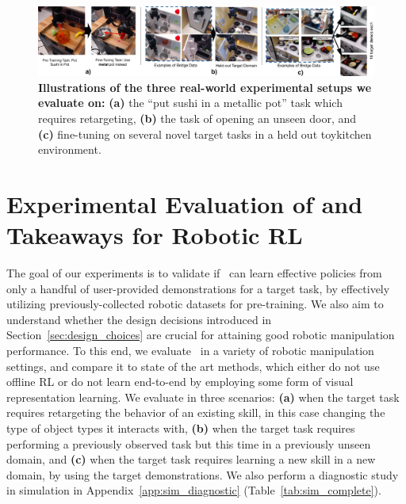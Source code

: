 \begin{figure}
\centering
  \includegraphics[width=1.0\linewidth]{chapters/ptr/scenarios_overview.pdf}
  \vspace{-0.3cm}
  \caption{\footnotesize{\textbf{Illustrations of the three real-world experimental setups we evaluate \ptrmethodname on:} \textbf{(a)} the ``put sushi in a metallic pot'' task which requires retargeting, \textbf{(b)} the task of opening an unseen door, and \textbf{(c)} fine-tuning on several novel target tasks in a held out toykitchen environment.}}
  \vspace{-0.6cm}
  \label{fig:experiments}
\end{figure}

\vspace{-0.2cm}
\section{Experimental Evaluation of \ptrmethodname and Takeaways for Robotic RL}
\label{sec:result}
\vspace{-0.2cm}
The goal of our experiments is to validate if \ptrmethodname\ can learn effective policies from only a handful of user-provided demonstrations for a target task, by effectively utilizing previously-collected robotic datasets for pre-training. We also aim to understand whether the design decisions introduced in Section~\ref{sec:design_choices} are crucial for attaining good robotic manipulation performance. To this end, we evaluate \ptrmethodname\ in a variety of robotic manipulation settings, and compare it to state of the art methods, which either do not use offline RL or do not learn end-to-end by employing some form of visual representation learning. We evaluate in three scenarios: \textbf{(a)} when the target task requires retargeting the behavior of an existing skill, in this case changing the type of object types it interacts with, \textbf{(b)} when the target task requires performing a previously observed task but this time in a previously unseen domain, and \textbf{(c)} when the target task requires learning a new skill in a new domain, by using the target demonstrations. We also perform a diagnostic study in simulation in Appendix~\ref{app:sim_diagnostic} (Table~\ref{tab:sim_complete}). 


